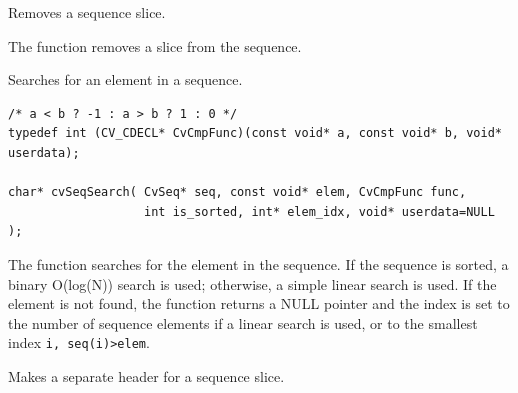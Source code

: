 Removes a sequence slice.


\begin{description}
\end{description}

The function removes a slice from the sequence.

\ifC

Searches for an element in a sequence.

\begin{lstlisting}
/* a < b ? -1 : a > b ? 1 : 0 */
typedef int (CV_CDECL* CvCmpFunc)(const void* a, const void* b, void* userdata);

char* cvSeqSearch( CvSeq* seq, const void* elem, CvCmpFunc func,
                   int is_sorted, int* elem_idx, void* userdata=NULL );
\end{lstlisting}

\begin{description}
\end{description}

The function searches for the element in the sequence. If
the sequence is sorted, a binary O(log(N)) search is used; otherwise, a
simple linear search is used. If the element is not found, the function
returns a NULL pointer and the index is set to the number of sequence
elements if a linear search is used, or to the smallest index
\texttt{i, seq(i)>elem}.

Makes a separate header for a sequence slice.


